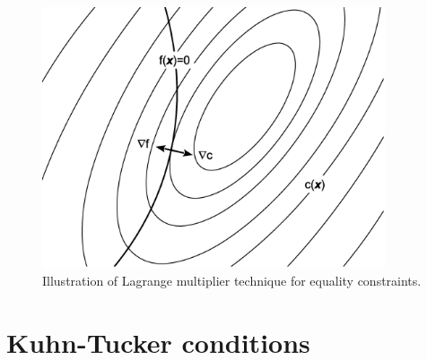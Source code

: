 \documentclass{article}
\begin{document}
\begin{figure}
	\includegraphics[width=0.9\textwidth]{Lagrange.eps}
	\caption{Illustration of Lagrange multiplier technique for equality constraints.}
\end{figure}


\section{Kuhn-Tucker conditions}


\end{document}
